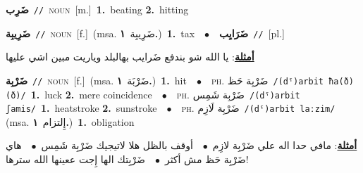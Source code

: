 \documentclass[10pt,a4paper,twoside]{article} %
\begin{document}
\begin{multicols}{2}
{\setlength\topsep{0pt}\textbf{\foreignlanguage{arabic}{ضَرِب}}\ {\color{gray}\texttt{//}\color{black}}\ \textsc{noun}\ [m.]\ \textbf{1.}~beating  \textbf{2.}~hitting\ } \vspace{2mm}

{\setlength\topsep{0pt}\textbf{\foreignlanguage{arabic}{ضَرِيبِة}}\ {\color{gray}\texttt{//}\color{black}}\ \textsc{noun}\ [f.]\ \color{gray}(msa. \foreignlanguage{arabic}{ضَرِيبِة}~\foreignlanguage{arabic}{\textbf{١.}})\color{black}\ \textbf{1.}~tax\ \ $\bullet$\ \ \setlength\topsep{0pt}\textbf{\foreignlanguage{arabic}{ضَرَايِب}}\ {\color{gray}\texttt{//}\color{black}}\ [pl.]\  \begin{flushright}\color{gray}\foreignlanguage{arabic}{\textbf{\underline{\foreignlanguage{arabic}{أمثلة}}}: يا الله شو بندفع ضَرايب بهالبلد وياريت مبين اشي عليها}\end{flushright}\color{black}} \vspace{2mm}

{\setlength\topsep{0pt}\textbf{\foreignlanguage{arabic}{ضَرْبِة}}\ {\color{gray}\texttt{//}\color{black}}\ \textsc{noun}\ [f.]\ \color{gray}(msa. \foreignlanguage{arabic}{ضَرْبَة}~\foreignlanguage{arabic}{\textbf{١.}})\color{black}\ \textbf{1.}~hit\ \ $\bullet$\ \ \textsc{ph.} \color{gray} \foreignlanguage{arabic}{ضَرْبِة حَظ}\color{black}\ {\color{gray}\texttt{/{\sffamily (dˤ)arbit ħa(ð)(ð)}/}\color{black}}\ \textbf{1.}~luck  \textbf{2.}~mere coincidence\ \ $\bullet$\ \ \textsc{ph.} \color{gray} \foreignlanguage{arabic}{ضَرْبِة شَمِس}\color{black}\ {\color{gray}\texttt{/{\sffamily (dˤ)arbit ʃamis}/}\color{black}}\ \textbf{1.}~heatstroke  \textbf{2.}~sunstroke\ \ $\bullet$\ \ \textsc{ph.} \color{gray} \foreignlanguage{arabic}{ضَرْبِة لَازِم}\color{black}\ {\color{gray}\texttt{/{\sffamily (dˤ)arbit laːzim}/}\color{black}}\ \color{gray} (msa. \foreignlanguage{arabic}{إِلتزام}~\foreignlanguage{arabic}{\textbf{١.}})\color{black}\ \textbf{1.}~obligation\  \begin{flushright}\color{gray}\foreignlanguage{arabic}{\textbf{\underline{\foreignlanguage{arabic}{أمثلة}}}: مافي حدا اله علي ضَرْبِة لازِم\ $\bullet$\ \  أوقف بالظل هلا لاتيجيك ضَرْبِة شَمِس\ $\bullet$\ \  هاي ضَرْبِة حَظ مش أكثر\ $\bullet$\ \  ضَرْبِتك الها إِجت ععينها الله سترها!}\end{flushright}\color{black}} \vspace{2mm}


\end{multicols}
\end{document}
